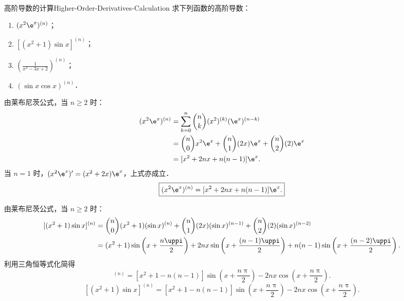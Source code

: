 \begin{problem}{高阶导数的计算}{Higher-Order-Derivatives-Calculation}
    求下列函数的高阶导数：
    \begin{enumerate}
        \item $(x^2\e^x)^{(n)}$；
        \item $[(x^2 + 1)\sin x]^{(n)}$；
        \item $\left( \frac{1}{x^2 - 3x + 2} \right)^{(n)}$；
        \item $(\sin x \cos x)^{(n)}$．
    \end{enumerate}
\end{problem}

\begin{solution}

    由莱布尼茨公式，当 $n \geqslant 2$ 时：
    \begin{equation}
        \begin{aligned}
            (x^2\e^x)^{(n)} & = \sum_{k=0}^n \binom{n}{k} (x^2)^{(k)} (\e^x)^{(n-k)}                   \\
                            & = \binom{n}{0} x^2 \e^x + \binom{n}{1} (2x) \e^x + \binom{n}{2} (2) \e^x \\
                            & = [x^2 + 2nx + n(n-1)]\e^x.
        \end{aligned}
    \end{equation}
    当 $n = 1$ 时，$(x^2\e^x)' = (x^2 + 2x)\e^x$，上式亦成立．
    \begin{equation}
        \boxed{(x^2\e^x)^{(n)} = [x^2 + 2nx + n(n-1)]\e^x.}
    \end{equation}


    由莱布尼茨公式，当 $n \geqslant 2$ 时：
    \begin{equation}
        \begin{aligned}
            \relax [(x^2+1)\sin x]^{(n)} & = \binom{n}{0}(x^2+1)(\sin x)^{(n)} + \binom{n}{1}(2x)(\sin x)^{(n-1)} + \binom{n}{2}(2)(\sin x)^{(n-2)}                                         \\
                                         & = (x^2+1)\sin\left(x + \frac{n\uppi}{2}\right) + 2nx\sin\left(x + \frac{(n-1)\uppi}{2}\right) + n(n-1)\sin\left(x + \frac{(n-2)\uppi}{2}\right).
        \end{aligned}
    \end{equation}
    利用三角恒等式化简得
    \begin{equation}
        [(x^2+1)\sin x]^{(n)} = [x^2 + 1 - n(n-1)]\sin\left(x + \frac{n\uppi}{2}\right) - 2nx\cos\left(x + \frac{n\uppi}{2}\right).
    \end{equation}
    \begin{equation}
        \boxed{[(x^2+1)\sin x]^{(n)} = [x^2 + 1 - n(n-1)]\sin\left(x + \frac{n\uppi}{2}\right) - 2nx\cos\left(x + \frac{n\uppi}{2}\right).}
    \end{equation}


\end{solution}
